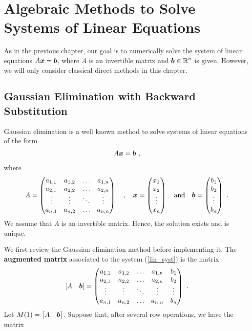 \chapter{Algebraic Methods to Solve Systems of Linear Equations}
\label{chaptSeqC}

As in the previous chapter, our goal is to numerically solve the
system of linear equations $A \bm{x} = \bm{b}$, where
$A$ is an invertible \nn matrix and $\displaystyle \bm{b} \in \mathbb{R}^n$ is given.
However, we will only consider classical direct methods in this chapter.

\section{Gaussian Elimination with Backward Substitution}

Gaussian elimination is a well known method to solve systems of linear
equations of the form
\begin{equation}\label{lin_syst}
A\bm{x}=\bm{b} \ ,
\end{equation}
where
\[
A = \begin{pmatrix}
a_{1,1} & a_{1,2} & \ldots & a_{1,n} \\
a_{2,1} & a_{2,2} & \ldots & a_{2,n} \\
\vdots & \vdots & \ddots & \vdots \\   %
a_{n,1} & a_{n,2} & \ldots & a_{n,n}
\end{pmatrix}
\quad , \quad
\VEC{x} = \begin{pmatrix}
x_1 \\ x_2 \\ \vdots \\ x_n
\end{pmatrix}
\quad \text{and} \quad
\VEC{b} = \begin{pmatrix}
b_1 \\ b_2 \\ \vdots \\ b_n
\end{pmatrix} \ .
\]
We assume that $A$ is an invertible matrix.  Hence, the solution
exists and is unique.

We first review the Gaussian elimination method before implementing it.
The {\bfseries augmented matrix}
associated to the system (\ref{lin_syst}) is the matrix
\[
[A\quad \bm{b}] = \begin{pmatrix}
a_{1,1} & a_{1,2} & \ldots & a_{1,n} & b_1 \\
a_{2,1} & a_{2,2} & \ldots & a_{2,n} & b_2\\
\vdots & \vdots & \ddots & \vdots & \vdots \\
a_{n,1} & a_{n,2} & \ldots & a_{n,n} & b_n
\end{pmatrix}  \ .
\]
Let $\displaystyle M(1) = \begin{bmatrix} A & \bm{b} \end{bmatrix}$.
Suppose that, after several row operations, we have the matrix

